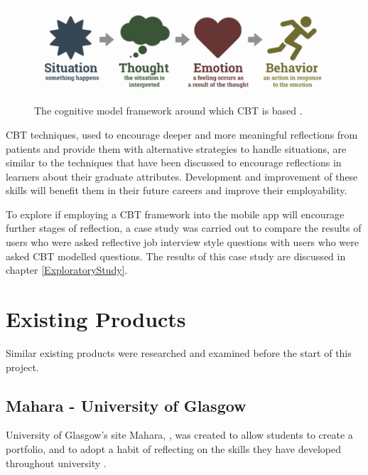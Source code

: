 \documentclass{l4proj}
\begin{document}
\begin{figure}[h!]
    \begin{centering}
    \includegraphics[scale=0.5]{images/cognitive-model.png}
    \caption{The cognitive model framework around which CBT is based \citep{therapist_aid_psychoeducation}.}
    \label{fig: CognitiveModel}
    \end{centering}
\end{figure}

CBT techniques, used to encourage deeper and more meaningful reflections from patients and provide them with alternative strategies to handle situations, are similar to the techniques that have been discussed to encourage reflections in learners about their graduate attributes. Development and improvement of these skills will benefit them in their future careers and improve their employability.

To explore if employing a CBT framework into the mobile app will encourage further stages of reflection, a case study was carried out to compare the results of users who were asked reflective job interview style questions with users who were asked CBT modelled questions. The results of this case study are discussed in chapter \ref{ExploratoryStudy}.

\section{Existing Products}

Similar existing products were researched and examined before the start of this project.

\subsection{Mahara - University of Glasgow}

University of Glasgow's site Mahara, \citep{mahara_dashboard}, was created to allow students to create a portfolio, and to adopt a habit of reflecting on the skills they have developed throughout university \citep{glasgow_university_attributes}.
\end{document}
